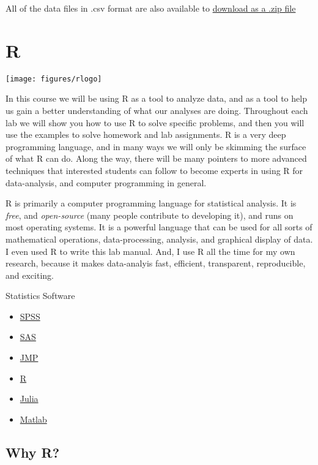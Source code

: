 \documentclass[
]{book}
\providecommand{\tightlist}{%
  \setlength{\itemsep}{0pt}\setlength{\parskip}{0pt}}
\begin{document}
All of the data files in .csv format are also available to \href{https://raw.githubusercontent.com/CrumpLab/statisticsLab/master/data/data_csv.zip}{download as a .zip file}

\hypertarget{r}{%
\section{R}\label{r}}

\texttt{[image: figures/rlogo]}

In this course we will be using R as a tool to analyze data, and as a tool to help us gain a better understanding of what our analyses are doing. Throughout each lab we will show you how to use R to solve specific problems, and then you will use the examples to solve homework and lab assignments. R is a very deep programming language, and in many ways we will only be skimming the surface of what R can do. Along the way, there will be many pointers to more advanced techniques that interested students can follow to become experts in using R for data-analysis, and computer programming in general.

R is primarily a computer programming language for statistical analysis. It is \emph{free}, and \emph{open-source} (many people contribute to developing it), and runs on most operating systems. It is a powerful language that can be used for all sorts of mathematical operations, data-processing, analysis, and graphical display of data. I even used R to write this lab manual. And, I use R all the time for my own research, because it makes data-analyis fast, efficient, transparent, reproducible, and exciting.

Statistics Software

\begin{itemize}
\tightlist
\item
  \href{http://www-01.ibm.com/software/analytics/spss/}{SPSS}
\item
  \href{http://www.sas.com/en_us/home.html}{SAS}
\item
  \href{http://www.jmp.com}{JMP}
\item
  \href{http://www.r-project.org}{R}
\item
  \href{http://julialang.org}{Julia}
\item
  \href{http://www.mathworks.com/products/matlab/}{Matlab}
\end{itemize}

\hypertarget{why-r}{%
\subsection{Why R?}\label{why-r}}
\end{document}
